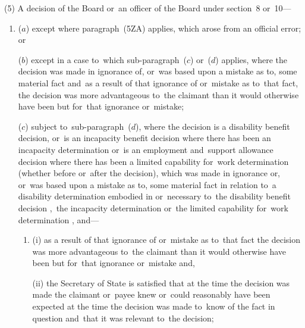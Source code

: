 \documentclass[12pt,a4paper]{article}
\begin{document}
(5) A decision of the 
Board or~an officer of the Board  %
under section~8 or~10—
\begin{enumerate}\item[]
($a$) 
except where paragraph~(5ZA) applies,  %
which arose from an official error; or

($b$) 
except in a case to~which sub-paragraph~($c$)  or~($d$)  applies,  %
where the decision was made in ignorance of, or~was based upon a mistake as to, some material fact and~as a result of that ignorance of or~mistake as to~that fact, the decision was more advantageous to~the claimant than it would otherwise have been but for~that ignorance or~mistake;


($c$) 
subject to~sub-paragraph~($d$),  %
where the decision is a disability benefit decision, or~is an incapacity benefit decision where there has been an incapacity determination 
or~is an employment and~support allowance decision where there has been a limited capability for~work determination  %
(whether before or~after the decision), which was made in ignorance or, or~was based upon a mistake as to, some material fact in relation to~a disability determination embodied in or~necessary to~the disability benefit decision%
,~the incapacity determination or~the limited capability for~work determination%
, and---
\begin{enumerate}\item[]
(i) as a result of that ignorance of or~mistake as to~that fact the decision was more advantageous to~the claimant than it would otherwise have been but for~that ignorance or~mistake and,

(ii) the Secretary of State is satisfied that at the time the decision was made the claimant or~payee knew or~could reasonably have been expected at the time the decision was made to~know of the fact in question and~that it was relevant to~the decision;
\end{enumerate}


\end{enumerate}
\end{document}
